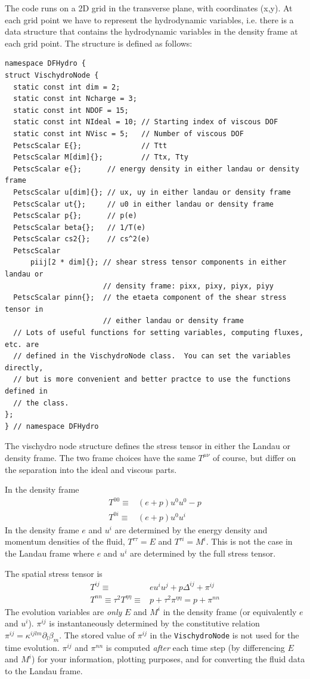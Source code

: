 \documentclass[12pt]{article}
\begin{document}
The code runs on a 2D grid in the transverse plane, with coordinates (x,y).  
At each grid point we have to represent the hydrodynamic variables, i.e. there is a data structure that contains the hydrodynamic variables in the density frame at each grid point.  The structure is defined as follows:

\begin{verbatim}
namespace DFHydro {
struct VischydroNode {
  static const int dim = 2;
  static const int Ncharge = 3;
  static const int NDOF = 15;
  static const int NIdeal = 10; // Starting index of viscous DOF
  static const int NVisc = 5;   // Number of viscous DOF
  PetscScalar E{};              // Ttt
  PetscScalar M[dim]{};         // Ttx, Tty
  PetscScalar e{};      // energy density in either landau or density frame
  PetscScalar u[dim]{}; // ux, uy in either landau or density frame
  PetscScalar ut{};     // u0 in either landau or density frame
  PetscScalar p{};      // p(e)
  PetscScalar beta{};   // 1/T(e)
  PetscScalar cs2{};    // cs^2(e)
  PetscScalar
      piij[2 * dim]{}; // shear stress tensor components in either landau or
                       // density frame: pixx, pixy, piyx, piyy
  PetscScalar pinn{};  // the etaeta component of the shear stress tensor in
                       // either landau or density frame
  // Lots of useful functions for setting variables, computing fluxes, etc. are
  // defined in the VischydroNode class.  You can set the variables directly,
  // but is more convenient and better practce to use the functions defined in
  // the class.
};
} // namespace DFHydro
\end{verbatim}
The vischydro node structure defines the stress tensor in either the Landau or density frame.   The two frame choices have the same $T^{\mu\nu}$ of course, but differ on the separation into the ideal and viscous parts.  

In the density frame 
\begin{align}
T^{00} \equiv & (e + p) u^0 u^0 - p   \\
T^{0i} \equiv & (e + p) u^0 u^i 
\end{align}
In the density frame $e$ and $u^i$ are determined by the energy density and
momentum densities of the fluid, $T^{\tau\tau}=E$ and $T^{\tau i}=M^i$. This is
not the case in the Landau frame where $e$ and $u^i$ are determined by the full
stress tensor.  

The spatial stress tensor is 
\begin{align}
T^{ij} \equiv &  e u^i u^j + p \Delta^{ij} + \pi^{ij} \\
T^{nn} \equiv \tau^2 T^{\eta\eta} \equiv & p + \tau^2 \pi^{\eta\eta} = p + \pi^{nn} 
\end{align}
The evolution variables are \emph{only} $E$ and $M^i$ in the
density frame (or equivalently $e$ and $u^i$).  $\pi^{ij}$ is instantaneously
determined by the constitutive relation $\pi^{ij} =
\kappa^{ijlm}\partial_l\beta_m$. The stored value of $\pi^{ij}$ in the {\tt VischydroNode} is not used for
the time evolution.  
$\pi^{ij}$ and $\pi^{nn}$ is computed \emph{after} each time step (by differencing $E$ and $M^i$) for your information,  plotting purposes,  and for converting the fluid data to the Landau frame. 
\end{document}
